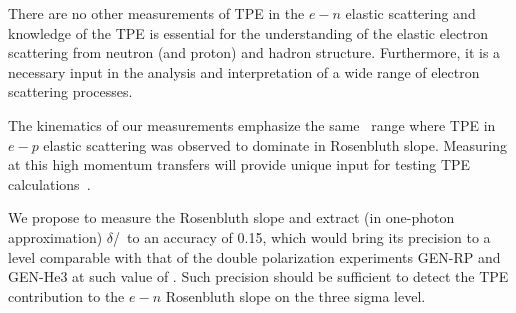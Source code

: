 There are no other measurements of TPE in the $e-n$ elastic scattering and knowledge of the TPE is essential for the understanding 
of the elastic electron scattering from neutron (and proton) and hadron structure.  
Furthermore, it is a necessary input in the analysis and interpretation of a wide range of electron scattering processes. 

The kinematics of our measurements emphasize the same \qsq~range where TPE in $e-p$ elastic scattering was observed to dominate in Rosenbluth slope.
Measuring at this high momentum transfers will provide unique input for testing TPE calculations~\cite{Blunden:2005ew}.

We propose to measure the Rosenbluth slope and extract (in one-photon approximation) $\delta$\gen/\gmn~to an accuracy of 0.15, which would bring its precision to a level comparable with that of the double polarization experiments GEN-RP and GEN-He3 at such value of \qsq.
Such precision should be sufficient to detect the TPE contribution to the $e-n$ Rosenbluth slope on the three sigma level.
